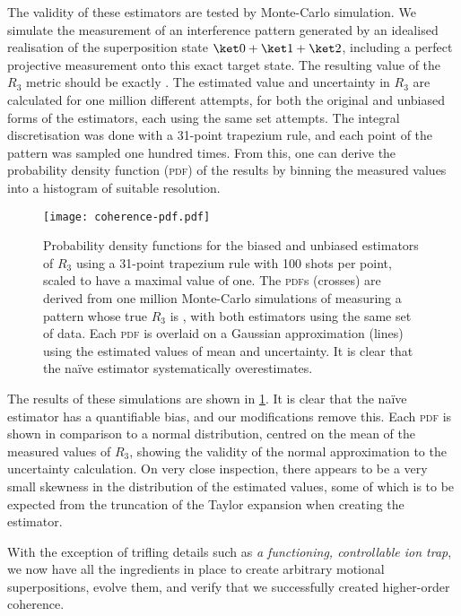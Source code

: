 The validity of these estimators are tested by Monte-Carlo simulation.
We simulate the measurement of an interference pattern generated by an idealised realisation of the superposition state $\ket0+\ket1+\ket2$, including a perfect projective measurement onto this exact target state.
The resulting value of the $R_3$ metric should be exactly .
The estimated value and uncertainty in $R_3$ are calculated for one million different attempts, for both the original and unbiased forms of the estimators, each using the same set attempts.
The integral discretisation was done with a 31-point trapezium rule, and each point of the pattern was sampled one hundred times.
From this, one can derive the probability density function (\textsc{pdf}) of the results by binning the measured values into a histogram of suitable resolution.

\begin{figure}%
    \texttt{[image: coherence-pdf.pdf]}%
    \caption[\textsc{pdf}s of biased and corrected estimators]{\label{fig:coherence-pdf}%
    Probability density functions for the biased and unbiased estimators of $R_3$ using a 31-point trapezium rule with 100 shots per point, scaled to have a maximal value of one.
    The \textsc{pdf}s (crosses) are derived from one million Monte-Carlo simulations of measuring a pattern whose true $R_3$ is , with both estimators using the same set of data.
    Each \textsc{pdf} is overlaid on a Gaussian approximation (lines) using the estimated values of mean and uncertainty.
    It is clear that the na\"ive estimator systematically overestimates.%
}%
\end{figure}

The results of these simulations are shown in \cref{fig:coherence-pdf}.
It is clear that the na\"ive estimator has a quantifiable bias, and our modifications remove this.
Each \textsc{pdf} is shown in comparison to a normal distribution, centred on the mean of the measured values of $R_3$, showing the validity of the normal approximation to the uncertainty calculation.
On very close inspection, there appears to be a very small skewness in the distribution of the estimated values, some of which is to be expected from the truncation of the Taylor expansion when creating the estimator.

With the exception of trifling details such as \emph{a functioning, controllable ion trap}, we now have all the ingredients in place to create arbitrary motional superpositions, evolve them, and verify that we successfully created higher-order coherence.


